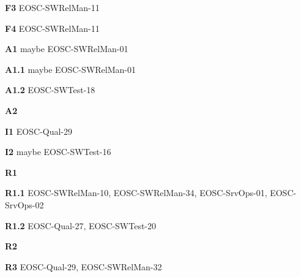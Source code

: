 \textbf{F3} EOSC-SWRelMan-11

\textbf{F4} EOSC-SWRelMan-11


\textbf{A1} maybe EOSC-SWRelMan-01

\textbf{A1.1} maybe EOSC-SWRelMan-01

\textbf{A1.2} EOSC-SWTest-18

\textbf{A2}

\textbf{I1} EOSC-Qual-29

\textbf{I2} maybe EOSC-SWTest-16

\textbf{R1}

\textbf{R1.1} EOSC-SWRelMan-10, EOSC-SWRelMan-34, EOSC-SrvOps-01, EOSC-SrvOps-02

\textbf{R1.2} EOSC-Qual-27, EOSC-SWTest-20

\textbf{R2}

\textbf{R3} EOSC-Qual-29, EOSC-SWRelMan-32




